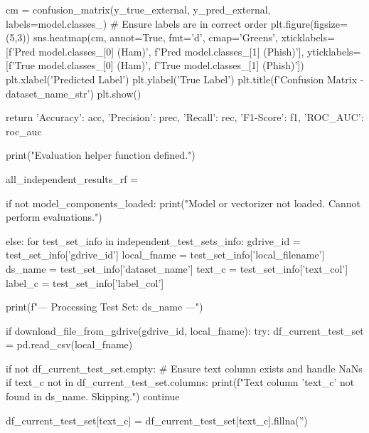 \begin{ffcode}
    cm = confusion_matrix(y_true_external, y_pred_external, labels=model.classes_) # Ensure labels are in correct order
    plt.figure(figsize=(5,3))
    sns.heatmap(cm, annot=True, fmt='d', cmap='Greens',
                xticklabels=[f'Pred {model.classes_[0]} (Ham)', f'Pred {model.classes_[1]} (Phish)'],
                yticklabels=[f'True {model.classes_[0]} (Ham)', f'True {model.classes_[1]} (Phish)'])
    plt.xlabel('Predicted Label')
    plt.ylabel('True Label')
    plt.title(f'Confusion Matrix - {dataset_name_str}')
    plt.show()

    return {'Accuracy': acc, 'Precision': prec, 'Recall': rec, 'F1-Score': f1, 'ROC_AUC': roc_auc}

print("Evaluation helper function defined.")

all_independent_results_rf = {}

if not model_components_loaded:
    print("Model or vectorizer not loaded. Cannot perform evaluations.")

else:
    for test_set_info in independent_test_sets_info:
        gdrive_id = test_set_info['gdrive_id']
        local_fname = test_set_info['local_filename']
        ds_name = test_set_info['dataset_name']
        text_c = test_set_info['text_col']
        label_c = test_set_info['label_col']

        print(f"\n--- Processing Test Set: {ds_name} ---")

        if download_file_from_gdrive(gdrive_id, local_fname):
            try:
                df_current_test_set = pd.read_csv(local_fname)

                if not df_current_test_set.empty:
                    # Ensure text column exists and handle NaNs
                    if text_c not in df_current_test_set.columns:
                        print(f"Text column '{text_c}' not found in {ds_name}. Skipping.")
                        continue

                    df_current_test_set[text_c] = df_current_test_set[text_c].fillna('')


\end{ffcode}
